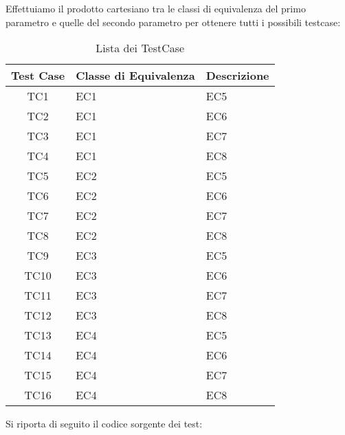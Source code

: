 Effettuiamo il prodotto cartesiano tra le classi di equivalenza del primo parametro 
e quelle del secondo parametro per ottenere tutti i possibili testcase:
\begin{table}[H]
    \centering
    \footnotesize
    \caption{Lista dei TestCase}
    \begin{tabularx}{\textwidth}{|c|X|X|}
        \hline
        Test Case & Classe di Equivalenza & Descrizione\\
        \hline
        TC1 & EC1 & EC5  \\
        \hline
        TC2 & EC1 & EC6  \\
        \hline
        TC3 & EC1 & EC7  \\
        \hline
        TC4 & EC1 & EC8  \\
        \hline
        TC5 & EC2 & EC5  \\
        \hline
        TC6 & EC2 & EC6  \\
        \hline
        TC7 & EC2 & EC7  \\
        \hline
        TC8 & EC2 & EC8  \\
        \hline
        TC9 & EC3 & EC5  \\
        \hline
        TC10 & EC3 & EC6  \\
        \hline
        TC11 & EC3 & EC7  \\
        \hline
        TC12 & EC3 & EC8  \\
        \hline
        TC13 & EC4 & EC5  \\
        \hline
        TC14 & EC4 & EC6  \\
        \hline
        TC15 & EC4 & EC7  \\
        \hline
        TC16 & EC4 & EC8  \\
        \hline
    \end{tabularx}
    \setlength{\tabcolsep}{8pt}
    \renewcommand{\arraystretch}{1.5}
\end{table}

Si riporta di seguito il codice sorgente dei test:


       
